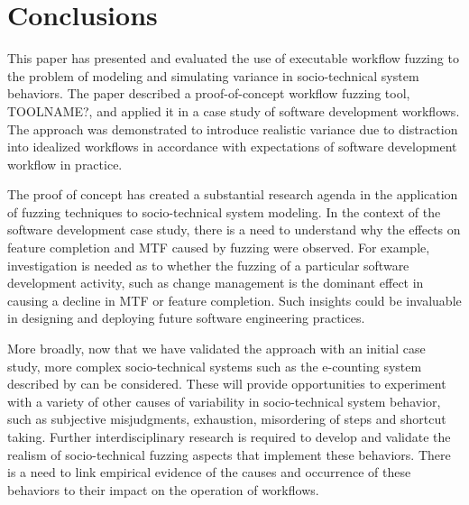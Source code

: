 \documentclass{llncs}
\begin{document}

\section{Conclusions}


This paper has presented and evaluated the use of executable workflow fuzzing to the problem of modeling and simulating
variance in socio-technical system behaviors.  The paper described a proof-of-concept workflow fuzzing tool, TOOLNAME?,
and applied it in a case study of software development workflows.  The approach was demonstrated to introduce realistic
variance due to distraction into idealized workflows in accordance with expectations of software development workflow in
practice.

The proof of concept has created a substantial research agenda in the application of fuzzing techniques to
socio-technical system modeling.  In the context of the software development case study, there is a need to understand
why the effects on feature completion and MTF caused by fuzzing were observed.  For example, investigation is needed as
to whether the fuzzing of a particular software development activity, such as change management is the dominant effect
in causing a decline in MTF or feature completion.  Such insights could be invaluable in designing and deploying future
software engineering practices.

More broadly, now that we have validated the approach with an initial case study, more complex socio-technical systems
such as the e-counting system described by \citet{lock07observations} can be considered.  These will provide
opportunities to experiment with a variety of other causes of variability in socio-technical system behavior, such as
subjective misjudgments, exhaustion, misordering of steps and shortcut taking.  Further interdisciplinary research is
required to develop and validate the realism of socio-technical fuzzing aspects that implement these behaviors. There is
a need to link empirical evidence of the causes and occurrence of these behaviors to their impact on the operation of
workflows.
\end{document}
